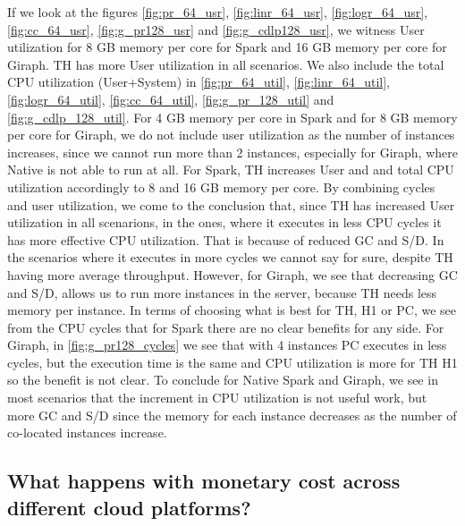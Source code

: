 If we look at the figures \ref{fig:pr_64_usr}, \ref{fig:linr_64_usr}, \ref{fig:logr_64_usr}, \ref{fig:cc_64_usr}, \ref{fig:g_pr128_usr} and \ref{fig:g_cdlp128_usr}, we witness User utilization for 8 GB memory per core for Spark and 16 GB memory per core for Giraph. TH has more User utilization in all scenarios.
We also include the total CPU utilization (User+System) in \ref{fig:pr_64_util}, \ref{fig:linr_64_util}, \ref{fig:logr_64_util}, \ref{fig:cc_64_util}, \ref{fig:g_pr_128_util} and \ref{fig:g_cdlp_128_util}.
For 4 GB memory per core in Spark and for 8 GB memory per core for Giraph, we do not include user utilization as the number of instances increases, since we cannot run more than 2 instances, especially for Giraph, where Native is not able to run at all. For Spark, TH increases User and and total CPU utilization accordingly to 8 and 16 GB memory per core.
By combining cycles and user utilization, we come to the conclusion that, since TH has increased User utilization in all scenarions, in the ones, where it executes in less CPU cycles it has more effective CPU utilization. That is because of reduced GC and S/D. In the scenarios where it executes in more cycles we cannot say for sure, despite TH having more average throughput. However, for Giraph, we see that decreasing GC and S/D, allows us to run more instances in the server, because TH needs less memory per instance. In terms of choosing what is best for TH, H1 or PC, we see from the CPU cycles that for Spark there are no clear benefits for any side. For Giraph, in \ref{fig:g_pr128_cycles} we see that with 4 instances PC executes in less cycles, but the execution time is the same and CPU utilization is more for TH H1 so the benefit is not clear.
To conclude for Native Spark and Giraph, we see in most scenarios that the increment in CPU utilization is not useful work, but more GC and S/D since the memory for each instance decreases as the number of co-located instances increase.

\subsection{What
happens with monetary cost across different cloud platforms?}

